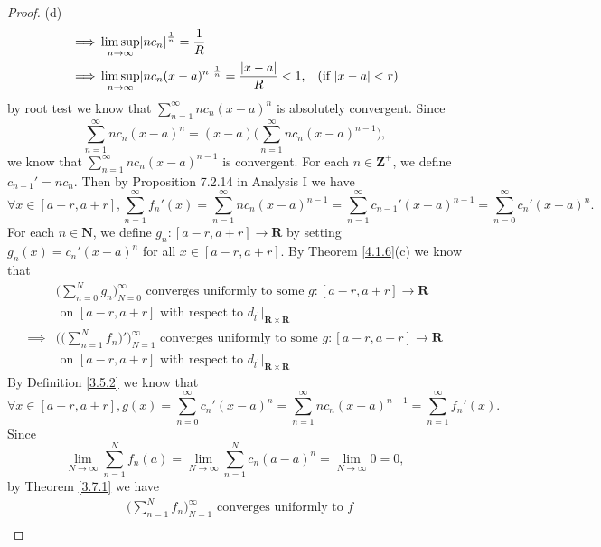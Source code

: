 \begin{proof}{(d)}
\begin{align*}
        \implies & \limsup_{n \to \infty} \abs*{n c_n}^{\frac{1}{n}} = \frac{1}{R}                                                                                                            \\
        \implies & \limsup_{n \to \infty} \abs*{n c_n (x - a)^n}^{\frac{1}{n}} = \frac{\abs*{x - a}}{R} < 1,                                & \text{(if \(\abs*{x - a} < r\))}
    \end{align*}
    by root test we know that \(\sum_{n = 1}^\infty n c_n (x - a)^n\) is absolutely convergent.
    Since
    \[
        \sum_{n = 1}^\infty n c_n (x - a)^n = (x - a) \bigg(\sum_{n = 1}^\infty n c_n (x - a)^{n - 1}\bigg),
    \]
    we know that \(\sum_{n = 1}^\infty n c_n (x - a)^{n - 1}\) is convergent.
    For each \(n \in \mathbf{Z}^+\), we define \(c_{n - 1}' = n c_n\).
    Then by Proposition 7.2.14 in Analysis I we have
    \[
        \forall x \in [a - r, a + r], \sum_{n = 1}^\infty f_n'(x) = \sum_{n = 1}^\infty n c_n (x - a)^{n - 1} = \sum_{n = 1}^\infty c_{n - 1}' (x - a)^{n - 1} = \sum_{n = 0}^\infty c_n' (x - a)^n.
    \]
    For each \(n \in \mathbf{N}\), we define \(g_n : [a - r, a + r] \to \mathbf{R}\) by setting \(g_n(x) = c_n' (x - a)^n\) for all \(x \in [a - r, a + r]\).
    By Theorem \ref{4.1.6}(c) we know that
    \begin{align*}
                 & \bigg(\sum_{n = 0}^N g_n\bigg)_{N = 0}^\infty \text{ converges uniformly to some } g : [a - r, a + r] \to \mathbf{R}              \\
                 & \text{ on } [a - r, a + r] \text{ with respect to } d_{l^1}|_{\mathbf{R} \times \mathbf{R}}                                       \\
        \implies & \Bigg(\bigg(\sum_{n = 1}^N f_n\bigg)'\Bigg)_{N = 1}^\infty \text{ converges uniformly to some } g : [a - r, a + r] \to \mathbf{R} \\
                 & \text{ on } [a - r, a + r] \text{ with respect to } d_{l^1}|_{\mathbf{R} \times \mathbf{R}}
    \end{align*}
    By Definition \ref{3.5.2} we know that
    \[
        \forall x \in [a - r, a + r], g(x) = \sum_{n = 0}^\infty c_n' (x - a)^n = \sum_{n = 1}^\infty n c_n (x - a)^{n - 1} = \sum_{n = 1}^\infty f_n'(x).
    \]
    Since
    \[
        \lim_{N \to \infty} \sum_{n = 1}^N f_n(a) = \lim_{N \to \infty} \sum_{n = 1}^N c_n (a - a)^n = \lim_{N \to \infty} 0 = 0,
    \]
    by Theorem \ref{3.7.1} we have
    \begin{align*}
         & \bigg(\sum_{n = 1}^N f_n\bigg)_{N = 1}^\infty \text{ converges uniformly to } f             \\

\end{align*}
\end{proof}
